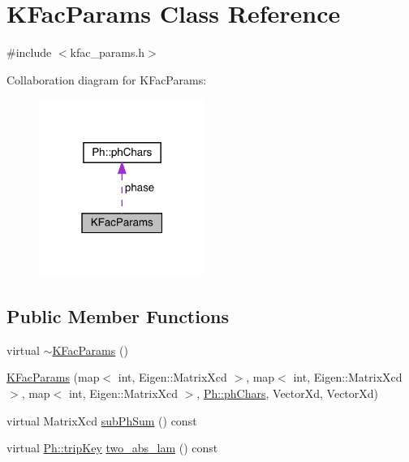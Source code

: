 \hypertarget{classKFacParams}{}\section{K\+Fac\+Params Class Reference}
\label{classKFacParams}


{\ttfamily \#include $<$kfac\+\_\+params.\+h$>$}



Collaboration diagram for K\+Fac\+Params\+:
\nopagebreak
\begin{figure}[H]
\begin{center}
\leavevmode
\includegraphics[width=154pt]{dc/d62/classKFacParams__coll__graph}
\end{center}
\end{figure}
\subsection*{Public Member Functions}
\begin{DoxyCompactItemize}
\item 
virtual \mbox{\hyperlink{classKFacParams_a6fd85cbed3c5b08e892084759f12efbd}{$\sim$\+K\+Fac\+Params}} ()
\item 
\mbox{\hyperlink{classKFacParams_af8bd9e570a48e06e183f37a0dda441a4}{K\+Fac\+Params}} (map$<$ int, Eigen\+::\+Matrix\+Xcd $>$, map$<$ int, Eigen\+::\+Matrix\+Xcd $>$, map$<$ int, Eigen\+::\+Matrix\+Xcd $>$, \mbox{\hyperlink{structPh_1_1phChars}{Ph\+::ph\+Chars}}, Vector\+Xd, Vector\+Xd)
\item 
virtual Matrix\+Xcd \mbox{\hyperlink{classKFacParams_a0f22066b9390b3a28b78d9c679c71f90}{sub\+Ph\+Sum}} () const
\item 
virtual \mbox{\hyperlink{namespacePh_afdd5bf3d7b37625115089ea3048e0cbb}{Ph\+::trip\+Key}} \mbox{\hyperlink{classKFacParams_a023894ddf4ee41134ce512a2bd2a8075}{two\+\_\+abs\+\_\+lam}} () const
\end{DoxyCompactItemize}
